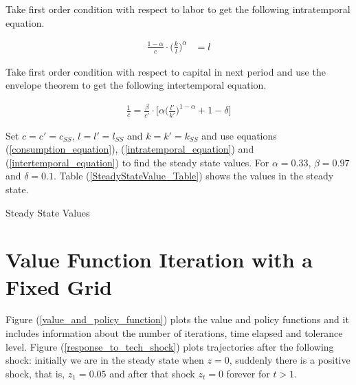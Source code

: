 \documentclass[a4paper,12pt]{article}
\begin{document}
    Take first order condition with respect to labor to get the following intratemporal equation. 
    
    \begin{align}\label{intratemporal_equation}
        \frac{1-\alpha}{c} \cdot \bigg(\frac{k}{l}\bigg)^{\alpha} & = l
    \end{align}
    
    Take first order condition with respect to capital in next period and use the envelope theorem to get the following intertemporal equation. 
    
    \begin{align}\label{intertemporal_equation}
        \frac{1}{c} =  \frac{\beta}{c'} \cdot  \bigg[\alpha \bigg(\frac{l'}{k'}\bigg)^{1-\alpha} + 1 - \delta \bigg]
    \end{align}
    
    Set $c=c'=c_{SS}$, $l=l'=l_{SS}$ and $k=k'=k_{SS}$ and use equations (\ref{consumption_equation}), (\ref{intratemporal_equation}) and (\ref{intertemporal_equation}) to find the steady state values. For $\alpha = 0.33$, $\beta = 0.97$ and $\delta = 0.1$. Table (\ref{SteadyStateValue_Table}) shows the values in the steady state. 
    
    
    
    \begin{table}[!htbp]
        \centering
        \caption[Short Caption for LoT]{Steady State Values}\label{SteadyStateValue_Table}
    \end{table}

    

     
    
    
    \medskip
    \medskip
    \section{Value Function Iteration with a Fixed Grid}     
    \medskip
    
    Figure (\ref{value_and_policy_function}) plots the value and policy functions and it includes information about the number of iterations, time elapsed and tolerance level. Figure (\ref{response_to_tech_shock}) plots trajectories after the following shock: initially we are in the steady state when $z=0$, suddenly there is a positive shock, that is, $z_1=0.05$ and after that shock $z_t=0$ forever for $t>1$. 
    
\end{document}
